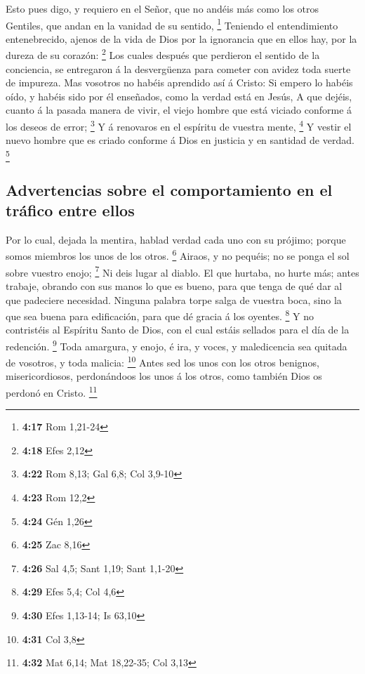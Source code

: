  Esto pues digo, y requiero en el Señor, que no andéis más
como los otros Gentiles, que andan en la vanidad de su sentido,
\footnote{\textbf{4:17} Rom 1,21-24}  Teniendo el
entendimiento entenebrecido, ajenos de la vida de Dios por la ignorancia
que en ellos hay, por la dureza de su corazón: \footnote{\textbf{4:18}
  Efes 2,12}  Los cuales después que perdieron el sentido
de la conciencia, se entregaron á la desvergüenza para cometer con
avidez toda suerte de impureza.  Mas vosotros no habéis
aprendido así á Cristo:  Si empero lo habéis oído, y habéis
sido por él enseñados, como la verdad está en Jesús,  A que
dejéis, cuanto á la pasada manera de vivir, el viejo hombre que está
viciado conforme á los deseos de error; \footnote{\textbf{4:22} Rom
  8,13; Gal 6,8; Col 3,9-10}  Y á renovaros en el espíritu
de vuestra mente, \footnote{\textbf{4:23} Rom 12,2}  Y
vestir el nuevo hombre que es criado conforme á Dios en justicia y en
santidad de verdad. \footnote{\textbf{4:24} Gén 1,26}

\hypertarget{advertencias-sobre-el-comportamiento-en-el-truxe1fico-entre-ellos}{%
\subsection{Advertencias sobre el comportamiento en el tráfico entre
ellos}\label{advertencias-sobre-el-comportamiento-en-el-truxe1fico-entre-ellos}}

 Por lo cual, dejada la mentira, hablad verdad cada uno con
su prójimo; porque somos miembros los unos de los otros. \footnote{\textbf{4:25}
  Zac 8,16}  Airaos, y no pequéis; no se ponga el sol sobre
vuestro enojo; \footnote{\textbf{4:26} Sal 4,5; Sant 1,19; Sant 1,1-20}
 Ni deis lugar al diablo.  El que hurtaba, no
hurte más; antes trabaje, obrando con sus manos lo que es bueno, para
que tenga de qué dar al que padeciere necesidad.  Ninguna
palabra torpe salga de vuestra boca, sino la que sea buena para
edificación, para que dé gracia á los oyentes. \footnote{\textbf{4:29}
  Efes 5,4; Col 4,6}  Y no contristéis al Espíritu Santo de
Dios, con el cual estáis sellados para el día de la redención.
\footnote{\textbf{4:30} Efes 1,13-14; Is 63,10}  Toda
amargura, y enojo, é ira, y voces, y maledicencia sea quitada de
vosotros, y toda malicia: \footnote{\textbf{4:31} Col 3,8} 
Antes sed los unos con los otros benignos, misericordiosos, perdonándoos
los unos á los otros, como también Dios os perdonó en Cristo.
\footnote{\textbf{4:32} Mat 6,14; Mat 18,22-35; Col 3,13}


